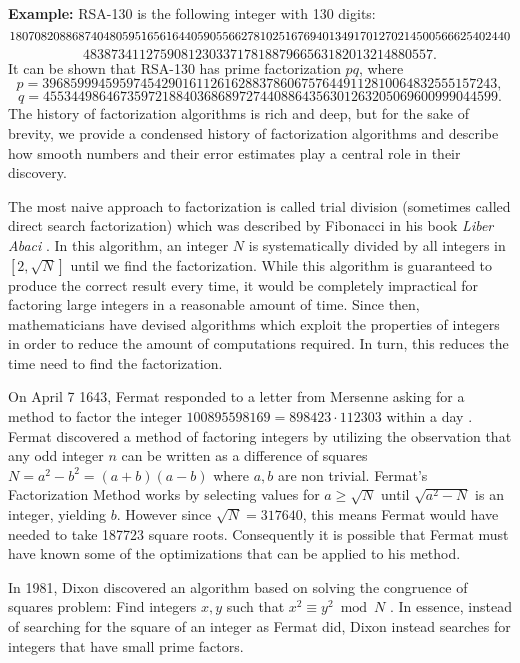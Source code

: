 \documentclass[12pt]{amsart}
\theoremstyle{definition}
\begin{document}
\noindent\textbf{Example:} RSA-130 is the following integer with 130 digits:
$$18070820886874048059516561644059055662781025167694013491701270214500566625402440\\$$
\vspace{-.7 in}
$$48387341127590812303371781887966563182013214880557.$$
\noindent It can be shown that RSA-130 has prime factorization $pq$, where
$$p = 39685999459597454290161126162883786067576449112810064832555157243,$$
\vspace{-.7 in}
$$q = 45534498646735972188403686897274408864356301263205069600999044599.$$
The history of factorization algorithms is rich and deep, but for the sake of brevity, we provide a condensed history of factorization algorithms and describe how smooth numbers and their error estimates play a central role in their discovery.

The most naive approach to factorization is called trial division (sometimes called direct search factorization) which was described by Fibonacci in his book \textit{Liber Abaci} \cite{Mollin}. In this algorithm, an integer $N$ is systematically divided by all integers in $[2, \sqrt{N}]$ until we find the factorization. While this algorithm is guaranteed to produce the correct result every time, it would be completely impractical for factoring large integers in a reasonable amount of time. Since then, mathematicians have devised algorithms which exploit the properties of integers in order to reduce the amount of computations required. In turn, this reduces the time need to find the factorization.

On April 7 1643, Fermat responded to a letter from Mersenne asking for a method to factor the integer $100895598169=898423\cdot 112303$ within a day \cite{Shiu}. Fermat discovered a method of factoring integers by utilizing the observation that any odd integer $n$ can be written as a difference of squares $N=a^2-b^2=(a+b)(a-b)$ where $a,b$ are non trivial. Fermat's Factorization Method works by selecting values for $a\geq\sqrt{N}$ until $\sqrt{a^2-N}$ is an integer, yielding $b$. However since
$\sqrt{N}=317640$, this means Fermat would have needed to take 187723 square roots. Consequently it is possible that Fermat must have known some of the optimizations that can be applied to his method.


In 1981, Dixon discovered an algorithm based on solving the congruence of squares problem: Find integers $x,y$ such that $x^2\equiv y^2 \bmod N$ \cite{Dixon}. In essence, instead of searching for the square of an integer as Fermat did, Dixon instead searches for integers that have small prime factors. 
\end{document}
